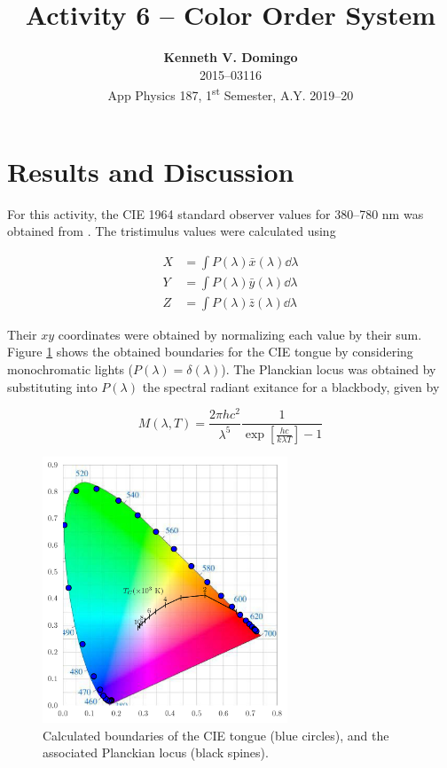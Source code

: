 \documentclass[12pt,a4paper]{article}
\newcommand{\activity}{Activity 6 -- Color Order System}
\begin{document}
\title{\TitleFont \activity}
\author[ ]{\textbf{Kenneth V. Domingo} \\
2015--03116 \\
App Physics 187, 1\textsuperscript{st} Semester, A.Y. 2019--20}

\maketitle
\thispagestyle{titlestyle}

\section*{Results and Discussion}
\setcounter{section}{1}

For this activity, the CIE 1964 standard observer values for 380--780 nm was obtained from \cite{cie64}. The tristimulus values were calculated using \cite{soriano}

\begin{align}
	X &= \int P(\lambda) \bar{x}(\lambda) \dd{\lambda} \nonumber \\
	Y &= \int P(\lambda) \bar{y}(\lambda) \dd{\lambda} \label{eq:tristimulus} \\
	Z &= \int P(\lambda) \bar{z}(\lambda) \dd{\lambda} \nonumber
\end{align}

\noindent
Their $xy$ coordinates were obtained by normalizing each value by their sum. Figure \ref{fig:locus} shows the obtained boundaries for the CIE tongue by considering monochromatic lights ($P(\lambda) = \delta(\lambda)$). The Planckian locus was obtained by substituting into $P(\lambda)$ the spectral radiant exitance for a blackbody, given by

\begin{equation}\label{eq:planck}
	M(\lambda, T) = \frac{2\pi hc^2}{\lambda^5} \frac{1}{\exp[\frac{hc}{k\lambda T}] - 1}
\end{equation}

\begin{figure}[htb]
	\centering
	\includegraphics[width=0.65\textwidth]{locus.png}
	\caption{Calculated boundaries of the CIE tongue (blue circles), and the associated Planckian locus (black spines).}
	\label{fig:locus}
\end{figure}



\end{document}
